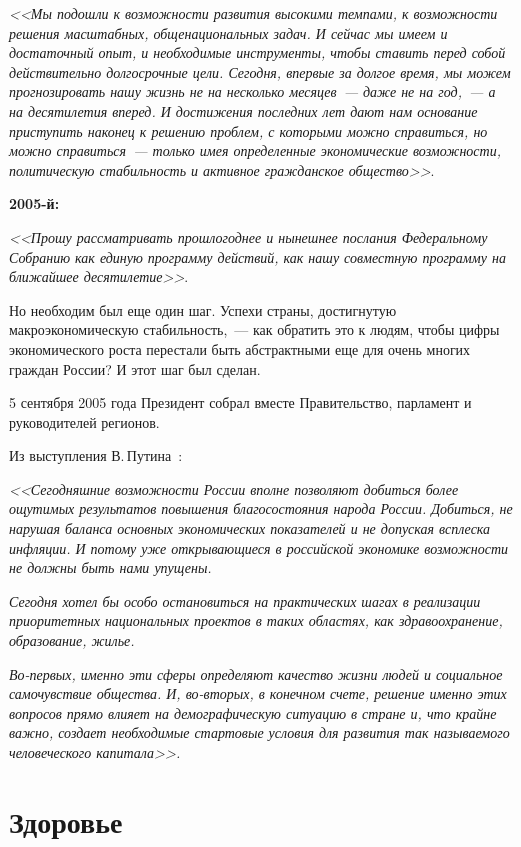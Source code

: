 \documentclass[article, 12pt, russian, oneside]{ncc}
\begin{document}
\emph{<<Мы подошли к возможности развития высокими темпами, к
  возможности решения масштабных, общенациональных задач. И сейчас мы
  имеем и достаточный опыт, и необходимые инструменты, чтобы ставить
  перед собой действительно долгосрочные цели. Сегодня, впервые за
  долгое время, мы можем прогнозировать нашу жизнь не на несколько
  месяцев~--- даже не на год,~--- а на десятилетия вперед. И
  достижения последних лет дают нам основание приступить наконец к
  решению проблем, с которыми можно справиться, но можно
  справиться~--- только имея определенные экономические возможности,
  политическую стабильность и активное гражданское
  общество>>}\cite{Putin_2004}.

\textbf{2005-й:}

\emph{<<Прошу рассматривать прошлогоднее и нынешнее послания
  Федеральному Собранию как единую программу действий, как нашу
  совместную программу на ближайшее десятилетие>>}\cite{Putin_2005}.

Но необходим был еще один шаг. Успехи страны, достигнутую
макроэкономическую стабильность,~--- как обратить это к людям, чтобы
цифры экономического роста перестали быть абстрактными еще для очень
многих граждан России? И этот шаг был сделан.

5 сентября 2005 года Президент собрал вместе Правительство, парламент
и руководителей регионов.

Из выступления В.\,Путина~\cite{Putin_Gov}:

\emph{<<Сегодняшние возможности России вполне позволяют добиться более
  ощутимых результатов повышения благосостояния народа
  России. Добиться, не нарушая баланса основных экономических
  показателей и не допуская всплеска инфляции. И потому уже
  открывающиеся в российской экономике возможности не должны быть нами
  упущены.}
    
\emph{Сегодня хотел бы особо остановиться на практических шагах в
  реализации приоритетных национальных проектов в таких областях, как
  здравоохранение, образование, жилье.}

\emph{Во-первых, именно эти сферы определяют качество жизни людей и
  социальное самочувствие общества. И, во-вторых, в конечном счете,
  решение именно этих вопросов прямо влияет на демографическую
  ситуацию в стране и, что крайне важно, создает необходимые стартовые
  условия для развития так называемого человеческого капитала>>.}
\newpage


\section{Здоровье}
\end{document}
